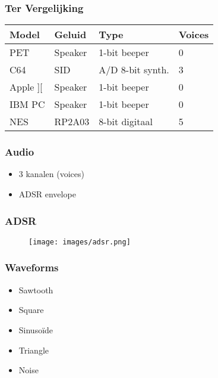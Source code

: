 \documentclass[aspectratio=43]{uva-inf-presentation}
\begin{document}
\begin{frame}
\frametitle{Ter Vergelijking}

\begin{tabular}{|l|l|l|l|}
\hline Model & Geluid & Type & Voices \\ \hline
PET & Speaker & 1-bit beeper & 0 \\
C64 & SID & A/D 8-bit synth. & 3 \\ \hline
Apple ][ & Speaker & 1-bit beeper & 0 \\
IBM PC & Speaker & 1-bit beeper & 0 \\
NES & RP2A03 & 8-bit digitaal & 5 \\ \hline
\end{tabular}

\end{frame}


\begin{frame}
\frametitle{Audio}

\begin{itemize}
\item 3 kanalen (voices)
\item ADSR envelope
\end{itemize}

\end{frame}


\begin{frame}
\frametitle{ADSR}

\begin{figure}
\texttt{[image: images/adsr.png]}
\end{figure}

\end{frame}


\begin{frame}
\frametitle{Waveforms}

\begin{itemize}
\item Sawtooth
\item Square
\item Sinuso\"ide
\item Triangle
\item Noise
\end{itemize}

\end{frame}
\end{document}
